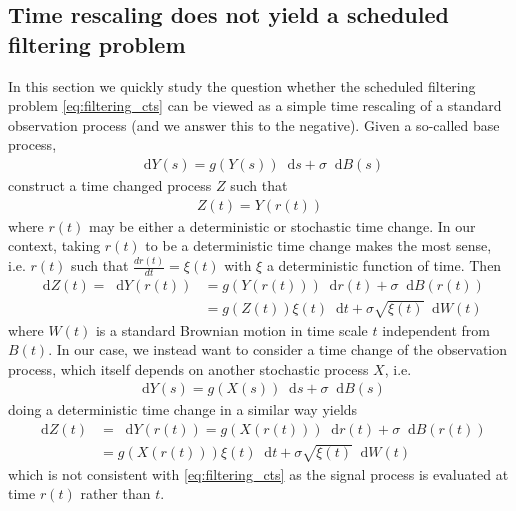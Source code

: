\documentclass[10pt]{article}
\numberwithin{equation}{section}
\numberwithin{figure}{section}
\theoremstyle{remark}
\newcommand{\dd }{\mathop{}\!\mathrm{d}}
\begin{document}
\begin{appendix}
\section{Time rescaling does not yield a scheduled filtering problem}\label{sec:rescale}
In this section we quickly study the question whether the scheduled filtering problem \eqref{eq:filtering_cts} can be viewed as a simple time rescaling of a standard observation process (and we answer this to the negative). Given a so-called base process, 
\begin{align*}
    \dd Y(s) = g(Y(s))\dd s + \sigma \dd B(s)  
\end{align*}
construct a time changed process $Z$ such that
\begin{align*}
    Z(t) = Y(r(t))
\end{align*}
where $r(t)$ may be either a deterministic or stochastic time change.  In our context, taking $r(t)$ to be a deterministic time change makes the most sense, i.e. $r(t)$ such that $\frac{dr(t)}{dt} = \xi(t)$ with $\xi$ a deterministic function of time.  Then 
\begin{align*}
    \dd Z(t) = \dd Y(r(t)) &= g(Y(r(t)))\dd r(t) + \sigma \dd B(r(t)) \\
    & = g(Z(t))\xi(t)\dd t + \sigma \sqrt{\xi(t)}\dd W(t) 
\end{align*}
where $W(t)$ is a standard Brownian motion in time scale $t$ independent from $B(t)$. In our case, we instead want to consider a time change of the observation process, which itself depends on another stochastic process $X$, i.e.
\begin{align*}
    \dd Y(s) = g( X(s))\dd s + \sigma \dd B(s)
\end{align*}
doing a deterministic time change in a similar way yields
\begin{align*}
    \dd Z(t) &= \dd Y(r(t)) = g(X(r(t)))\dd r(t) + \sigma \dd B(r(t)) \\
    & = g(X(r(t))) \xi(t) \dd t +  \sigma \sqrt{\xi(t)} \dd W(t) 
\end{align*}
which is not consistent with \eqref{eq:filtering_cts} as the signal process is evaluated at time $r(t)$ rather than $t$. 
\end{appendix}



\end{document}
